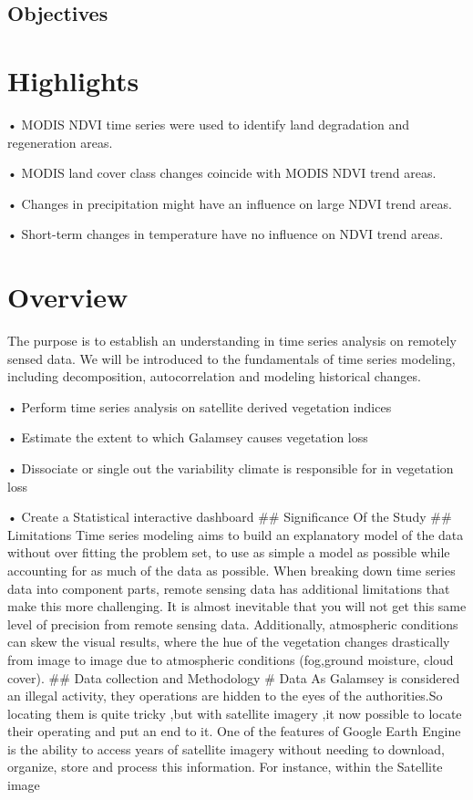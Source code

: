 \documentclass[10pt]{report}
\begin{document}
\hypertarget{objectives}{%
\subsection{Objectives}\label{objectives}}

\hypertarget{highlights}{%
\section{Highlights}\label{highlights}}

• MODIS NDVI time series were used to identify land degradation and
regeneration areas.

• MODIS land cover class changes coincide with MODIS NDVI trend areas.

• Changes in precipitation might have an influence on large NDVI trend
areas.

• Short-term changes in temperature have no influence on NDVI trend
areas.

\hypertarget{overview}{%
\section{Overview}\label{overview}}

The purpose is to establish an understanding in time series analysis on
remotely sensed data. We will be introduced to the fundamentals of time
series modeling, including decomposition, autocorrelation and modeling
historical changes.

• Perform time series analysis on satellite derived vegetation indices

• Estimate the extent to which Galamsey causes vegetation loss

• Dissociate or single out the variability climate is responsible for in
vegetation loss

• Create a Statistical interactive dashboard \#\# Significance Of the
Study \#\# Limitations Time series modeling aims to build an explanatory
model of the data without over fitting the problem set, to use as simple
a model as possible while accounting for as much of the data as
possible. When breaking down time series data into component parts,
remote sensing data has additional limitations that make this more
challenging. It is almost inevitable that you will not get this same
level of precision from remote sensing data. Additionally, atmospheric
conditions can skew the visual results, where the hue of the vegetation
changes drastically from image to image due to atmospheric conditions
(fog,ground moisture, cloud cover). \#\# Data collection and Methodology
\# Data As Galamsey is considered an illegal activity, they operations
are hidden to the eyes of the authorities.So locating them is quite
tricky ,but with satellite imagery ,it now possible to locate their
operating and put an end to it. One of the features of Google Earth
Engine is the ability to access years of satellite imagery without
needing to download, organize, store and process this information. For
instance, within the Satellite image
\end{document}
